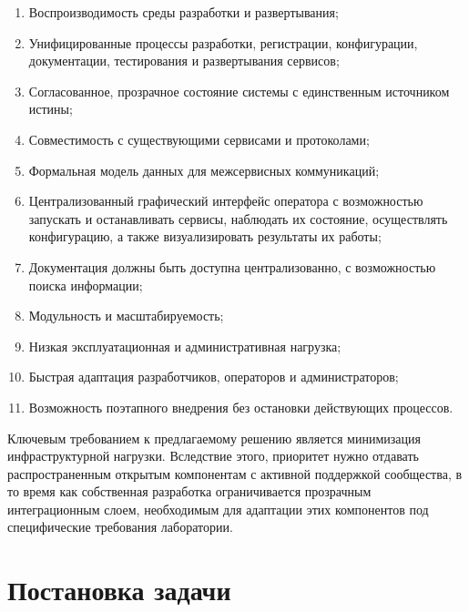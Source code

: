 \documentclass[../thesis.tex]{subfiles}
\begin{document}
	\begin{enumerate}
		\item Воспроизводимость среды разработки и развертывания;

		\item Унифицированные процессы разработки, регистрации, конфигурации, документации, тестирования
			и развертывания сервисов;

		\item Согласованное, прозрачное состояние системы с единственным источником истины;

		\item Совместимость с существующими сервисами и протоколами;

		\item Формальная модель данных для межсервисных коммуникаций;

		\item Централизованный графический интерфейс оператора с возможностью запускать и останавливать
			сервисы, наблюдать их состояние, осуществлять конфигурацию, а также визуализировать
			результаты их работы;

		\item Документация должны быть доступна централизованно, с возможностью поиска информации;

		\item Модульность и масштабируемость;

		\item Низкая эксплуатационная и административная нагрузка;

		\item Быстрая адаптация разработчиков, операторов и администраторов;

		\item Возможность поэтапного внедрения без остановки действующих процессов.
	\end{enumerate}

	Ключевым требованием к предлагаемому решению является минимизация инфраструктурной нагрузки. Вследствие
	этого, приоритет нужно отдавать распространенным открытым компонентам с активной поддержкой
	сообщества, в то время как собственная разработка ограничивается прозрачным интеграционным слоем,
	необходимым для адаптации этих компонентов под специфические требования лаборатории.

	\section{Постановка задачи}
\end{document}
